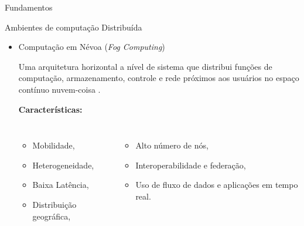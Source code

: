 \documentclass[aspectratio=43,10pt]{beamer}
\begin{document}
\begin{frame}[fragile]{Fundamentos}
  \begin{alertblock}{Ambientes de computação Distribuída}
  \begin{itemize}
  \item Computação em Névoa (\emph{Fog Computing})
  
  
  
  Uma arquitetura horizontal a nível de sistema que distribui funções de
  computação, armazenamento, controle e rede próximos aos usuários no espaço
  contínuo nuvem-coisa \cite{IEEECommunicationsSociety2018}.
  
  \textbf{Características:}
  \begin{columns}[T,onlytextwidth]
    \begin{itemize}
      \item Mobilidade,
      \item Heterogeneidade,
      \item Baixa Latência,
      \item Distribuição geográfica,
    \end{itemize}
    \begin{itemize}
      \item Alto número de nós,
      \item Interoperabilidade e federação,
      \item Uso de fluxo de dados e aplicações em tempo real.
    \end{itemize}
  \end{columns}
\end{itemize}
\end{alertblock}
\end{frame}
\end{document}
